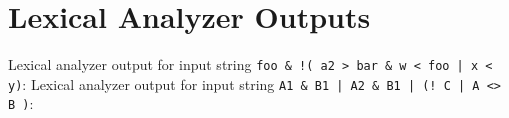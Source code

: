 \documentclass[12pt]{article}
\begin{document}
\pagebreak
\appendix
\appendixpage
\section{Lexical Analyzer Outputs}
Lexical analyzer output for input string \verb"foo & !( a2 > bar & w < foo | x < y)":
\pagebreak
Lexical analyzer output for input string \verb"A1 & B1 | A2 & B1 | (! C | A <> B )":
\pagebreak
\nocite{*}

{}
\end{document}
